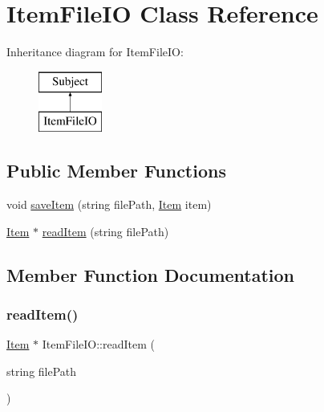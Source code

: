 \hypertarget{class_item_file_i_o}{}\section{Item\+File\+IO Class Reference}
\label{class_item_file_i_o}
Inheritance diagram for Item\+File\+IO\+:\begin{figure}[H]
\begin{center}
\leavevmode
\includegraphics[height=2.000000cm]{class_item_file_i_o}
\end{center}
\end{figure}
\subsection*{Public Member Functions}
\begin{DoxyCompactItemize}
\item 
void \hyperlink{class_item_file_i_o_a573d19f26b2ad842d1aa91122665d2fc}{save\+Item} (string file\+Path, \hyperlink{class_item}{Item} item)
\item 
\hyperlink{class_item}{Item} $\ast$ \hyperlink{class_item_file_i_o_a4202e09736fcfa1f5cd1aa544904ab52}{read\+Item} (string file\+Path)
\end{DoxyCompactItemize}


\subsection{Member Function Documentation}
\hypertarget{class_item_file_i_o_a4202e09736fcfa1f5cd1aa544904ab52}{}\label{class_item_file_i_o_a4202e09736fcfa1f5cd1aa544904ab52} 
\subsubsection{\texorpdfstring{read\+Item()}{readItem()}}
{\footnotesize\ttfamily \hyperlink{class_item}{Item} $\ast$ Item\+File\+I\+O\+::read\+Item (\begin{DoxyParamCaption}\item[{string}]{file\+Path }\end{DoxyParamCaption})}

